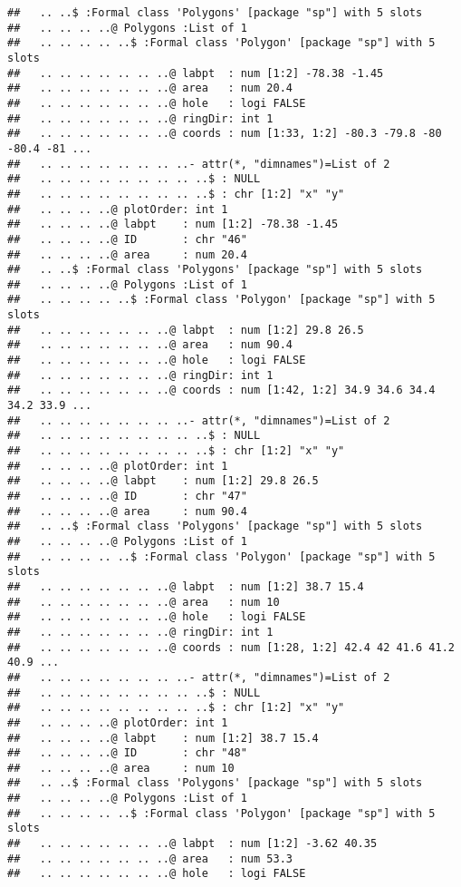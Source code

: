 \documentclass[]{article}
\begin{document}
\begin{verbatim}
##   .. ..$ :Formal class 'Polygons' [package "sp"] with 5 slots
##   .. .. .. ..@ Polygons :List of 1
##   .. .. .. .. ..$ :Formal class 'Polygon' [package "sp"] with 5 slots
##   .. .. .. .. .. .. ..@ labpt  : num [1:2] -78.38 -1.45
##   .. .. .. .. .. .. ..@ area   : num 20.4
##   .. .. .. .. .. .. ..@ hole   : logi FALSE
##   .. .. .. .. .. .. ..@ ringDir: int 1
##   .. .. .. .. .. .. ..@ coords : num [1:33, 1:2] -80.3 -79.8 -80 -80.4 -81 ...
##   .. .. .. .. .. .. .. ..- attr(*, "dimnames")=List of 2
##   .. .. .. .. .. .. .. .. ..$ : NULL
##   .. .. .. .. .. .. .. .. ..$ : chr [1:2] "x" "y"
##   .. .. .. ..@ plotOrder: int 1
##   .. .. .. ..@ labpt    : num [1:2] -78.38 -1.45
##   .. .. .. ..@ ID       : chr "46"
##   .. .. .. ..@ area     : num 20.4
##   .. ..$ :Formal class 'Polygons' [package "sp"] with 5 slots
##   .. .. .. ..@ Polygons :List of 1
##   .. .. .. .. ..$ :Formal class 'Polygon' [package "sp"] with 5 slots
##   .. .. .. .. .. .. ..@ labpt  : num [1:2] 29.8 26.5
##   .. .. .. .. .. .. ..@ area   : num 90.4
##   .. .. .. .. .. .. ..@ hole   : logi FALSE
##   .. .. .. .. .. .. ..@ ringDir: int 1
##   .. .. .. .. .. .. ..@ coords : num [1:42, 1:2] 34.9 34.6 34.4 34.2 33.9 ...
##   .. .. .. .. .. .. .. ..- attr(*, "dimnames")=List of 2
##   .. .. .. .. .. .. .. .. ..$ : NULL
##   .. .. .. .. .. .. .. .. ..$ : chr [1:2] "x" "y"
##   .. .. .. ..@ plotOrder: int 1
##   .. .. .. ..@ labpt    : num [1:2] 29.8 26.5
##   .. .. .. ..@ ID       : chr "47"
##   .. .. .. ..@ area     : num 90.4
##   .. ..$ :Formal class 'Polygons' [package "sp"] with 5 slots
##   .. .. .. ..@ Polygons :List of 1
##   .. .. .. .. ..$ :Formal class 'Polygon' [package "sp"] with 5 slots
##   .. .. .. .. .. .. ..@ labpt  : num [1:2] 38.7 15.4
##   .. .. .. .. .. .. ..@ area   : num 10
##   .. .. .. .. .. .. ..@ hole   : logi FALSE
##   .. .. .. .. .. .. ..@ ringDir: int 1
##   .. .. .. .. .. .. ..@ coords : num [1:28, 1:2] 42.4 42 41.6 41.2 40.9 ...
##   .. .. .. .. .. .. .. ..- attr(*, "dimnames")=List of 2
##   .. .. .. .. .. .. .. .. ..$ : NULL
##   .. .. .. .. .. .. .. .. ..$ : chr [1:2] "x" "y"
##   .. .. .. ..@ plotOrder: int 1
##   .. .. .. ..@ labpt    : num [1:2] 38.7 15.4
##   .. .. .. ..@ ID       : chr "48"
##   .. .. .. ..@ area     : num 10
##   .. ..$ :Formal class 'Polygons' [package "sp"] with 5 slots
##   .. .. .. ..@ Polygons :List of 1
##   .. .. .. .. ..$ :Formal class 'Polygon' [package "sp"] with 5 slots
##   .. .. .. .. .. .. ..@ labpt  : num [1:2] -3.62 40.35
##   .. .. .. .. .. .. ..@ area   : num 53.3
##   .. .. .. .. .. .. ..@ hole   : logi FALSE

\end{verbatim}
\end{document}

